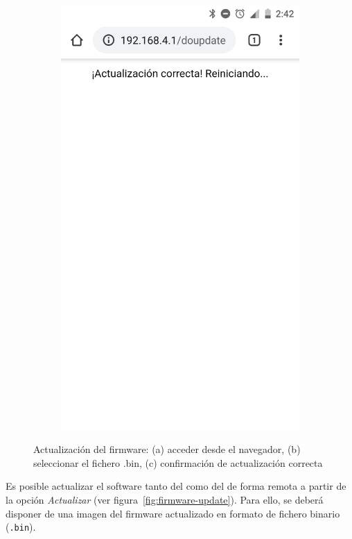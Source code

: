 \begin{figure}
\begin{subfigure}{0.32\columnwidth}
  \includegraphics[width=1\columnwidth,frame]{images/interior-firmware-update-done}
  \caption{}
  \label{fig:interior-firmware-update-done}
\end{subfigure}
\caption{Actualización del firmware: (a) acceder desde el navegador, (b) seleccionar el fichero .bin, (c) confirmación de actualización correcta}
\label{fig:firmaware-update-browser}
\end{figure}

Es posible actualizar el software tanto del \MIE como del \MEE de forma remota a partir de la opción \emph{Actualizar} (ver figura~\ref{fig:firmware-update}). Para ello, se deberá disponer de una imagen del firmware actualizado en formato de fichero binario (\texttt{.bin}).

